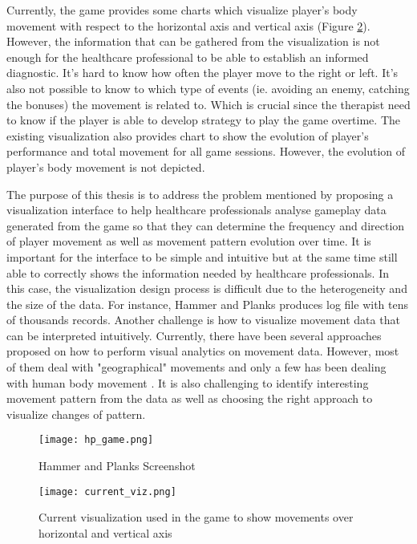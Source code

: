 Currently, the game provides some charts which visualize player's body movement with respect to the horizontal axis and vertical axis (Figure \ref{current_viz}). However, the information that can be gathered from the visualization is not enough for the healthcare professional to be able to establish an informed diagnostic. It's hard to know how often the player move to the right or left. It's also not possible to know to which type of events (ie. avoiding an enemy, catching the bonuses) the movement is related to. Which is crucial since the therapist need to know if the player is able to develop strategy to play the game overtime. The existing visualization also provides chart to show the evolution of player's performance and total movement for all game sessions. However, the evolution of player's body movement is not depicted.

The purpose of this thesis is to address the problem mentioned by proposing a visualization interface to help healthcare professionals analyse gameplay data generated from the game so that they can determine the frequency and direction of player movement as well as movement pattern evolution over time. It is important for the interface to be simple and intuitive but at the same time still able to correctly shows the information needed by healthcare professionals. In this case, the visualization design process is difficult due to the heterogeneity and the size of the data. For instance, Hammer and Planks produces log file with tens of thousands records. Another challenge is how to visualize movement data that can be interpreted intuitively. Currently, there have been several approaches proposed on how to perform visual analytics on movement data. However, most of them deal with "geographical" movements \cite{adrienko_book} and only a few has been dealing with human body movement \cite{bernard2013}. It is also challenging to identify interesting movement pattern from the data as well as choosing the right approach to visualize changes of pattern.

\begin{figure}
\centering
\texttt{[image: hp\_game.png]}
\caption{Hammer and Planks Screenshot \label{game_screenshot}}
\end{figure}

\begin{figure}
\centering
\texttt{[image: current\_viz.png]}
\caption{Current visualization used in the game to show movements over horizontal and vertical axis \label{current_viz}}
\end{figure}



